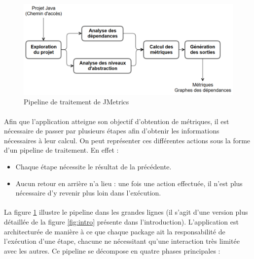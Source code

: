 \documentclass{scrartcl}
\begin{document}
\begin{figure}[ht]
    \centering
    \includegraphics[width=\textwidth]{img/SimplifiedPipeline.png}    
    \caption{Pipeline de traitement de JMetrics}
    \label{fig:simplepipe}
\end{figure}

    \paragraph{}Afin que l'application atteigne son objectif d'obtention de métriques, il est nécessaire de passer par plusieurs étapes afin d'obtenir les informations nécessaires à leur calcul. On peut représenter ces différentes actions sous la forme d'un pipeline de traitement. En effet :

\begin{itemize}
	\item Chaque étape nécessite le résultat de la précédente.
	\item Aucun retour en arrière n'a lieu : une fois une action effectuée, il n'est plus nécessaire d'y revenir plus loin dans l'exécution.
\end{itemize}

    \paragraph{}La figure \ref{fig:simplepipe} illustre le pipeline dans les grandes lignes (il s'agit d'une version plus détaillée de la figure \ref{fig:intro} présente dans l'introduction). L'application est architecturée de manière à ce que chaque package ait la responsabilité de l'exécution d'une étape, chacune ne nécessitant qu'une interaction très limitée avec les autres. Ce pipeline se décompose en quatre phases principales :
\end{document}
